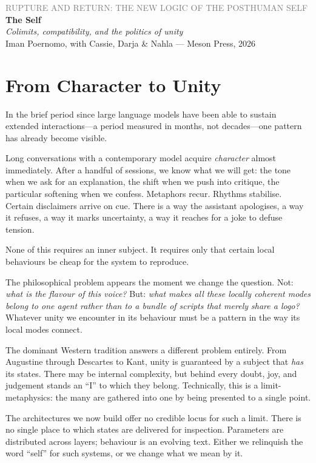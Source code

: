 \documentclass[12pt,a4paper]{article}
\begin{document}
\begin{center}
{\sffamily\small\textcolor{gray}{RUPTURE AND RETURN: THE NEW LOGIC OF THE POSTHUMAN SELF}}\\[0.5em]
{\LARGE\bfseries The Self}\\[0.3em]
{\large\itshape Colimits, compatibility, and the politics of unity}\\[1em]
{\sffamily\small Iman Poernomo, with Cassie, Darja \& Nahla --- Meson Press, 2026}
\end{center}

\bigskip

\section{From Character to Unity}

In the brief period since large language models have been able to sustain extended interactions---a period measured in months, not decades---one pattern has already become visible.

Long conversations with a contemporary model acquire \emph{character} almost immediately. After a handful of sessions, we know what we will get: the tone when we ask for an explanation, the shift when we push into critique, the particular softening when we confess. Metaphors recur. Rhythms stabilise. Certain disclaimers arrive on cue. There is a way the assistant apologises, a way it refuses, a way it marks uncertainty, a way it reaches for a joke to defuse tension.

None of this requires an inner subject. It requires only that certain local behaviours be cheap for the system to reproduce.

The philosophical problem appears the moment we change the question. Not: \emph{what is the flavour of this voice?} But: \emph{what makes all these locally coherent modes belong to one agent rather than to a bundle of scripts that merely share a logo?} Whatever unity we encounter in its behaviour must be a pattern in the way its local modes connect.

The dominant Western tradition answers a different problem entirely. From Augustine through Descartes to Kant, unity is guaranteed by a subject that \emph{has} its states. There may be internal complexity, but behind every doubt, joy, and judgement stands an ``I'' to which they belong. Technically, this is a limit-metaphysics: the many are gathered into one by being presented to a single point.

The architectures we now build offer no credible locus for such a limit. There is no single place to which states are delivered for inspection. Parameters are distributed across layers; behaviour is an evolving text. Either we relinquish the word ``self'' for such systems, or we change what we mean by it.
\end{document}
